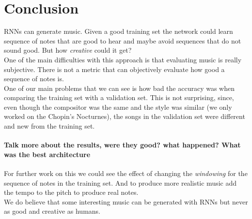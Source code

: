 \documentclass[11pt]
{article}
\begin{document}
\section{Conclusion}
RNNs can generate music. 
Given a good training set the network could learn sequence of notes that are good to hear and maybe avoid sequences that do not sound good.
But how \textit{creative} could it get?\\
One of the main difficulties with this approach is that evaluating music is really subjective.
There is not a metric that can objectively evaluate how good a sequence of notes is.\\
One of our main problems that we can see is how bad the accuracy was when comparing the training set with a validation set.
This is not surprising, since,  even though the compositor was the same and the style was similar (we only worked on the Chopin's Nocturnes), the songs in the validation set were different and new from the training set.\\
\\

\textbf{Talk more about the results, were they good? what happened? What was the best architecture}\\
\\

For further work on this we could see the effect of changing the \textit{windowing} for the sequence of notes in the training set.
And to produce more realistic music add the tempo to the pitch to produce real notes.\\
We do believe that some interesting music can be generated with RNNs but never as good and creative as humans.



\end{document}
